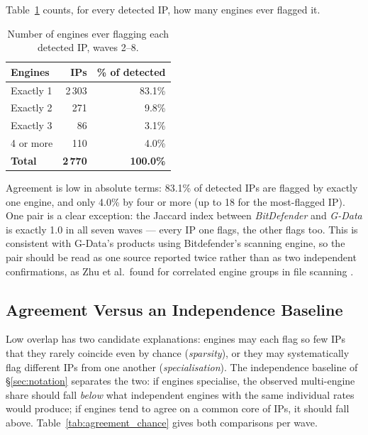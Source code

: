 Table~\ref{tab:agreement} counts, for every detected IP, how many engines ever flagged it.

\begin{table}[h]
  \centering
  \caption{Number of engines ever flagging each detected IP, waves 2--8.}
  \label{tab:agreement}
  \begin{tabular}{lrr}
    \toprule
    \textbf{Engines} & \textbf{IPs} & \textbf{\% of detected} \\
    \midrule
    Exactly 1  & 2\,303 & 83.1\% \\
    Exactly 2  & 271    & 9.8\%  \\
    Exactly 3  & 86     & 3.1\%  \\
    4 or more  & 110    & 4.0\%  \\
    \midrule
    \textbf{Total} & \textbf{2\,770} & \textbf{100.0\%} \\
    \bottomrule
  \end{tabular}
\end{table}

Agreement is low in absolute terms: 83.1\% of detected IPs are flagged by exactly one engine, and
only 4.0\% by four or more (up to 18 for the most-flagged IP). One pair is a clear exception: the
Jaccard index between \emph{BitDefender} and \emph{G-Data} is exactly 1.0 in all seven waves --- every
IP one flags, the other flags too. This is consistent with G-Data's products using Bitdefender's
scanning engine, so the pair should be read as one source reported twice rather than as two
independent confirmations, as Zhu et al.\ found for correlated engine groups in file scanning
\cite{zhu2020labeldynamics}.

\subsection{Agreement Versus an Independence Baseline}
\label{sec:agreement_vs_chance}

Low overlap has two candidate explanations: engines may each flag so few IPs that they rarely
coincide even by chance (\emph{sparsity}), or they may systematically flag different IPs from one
another (\emph{specialisation}). The independence baseline of \S\ref{sec:notation} separates the
two: if engines specialise, the observed multi-engine share should fall \emph{below} what
independent engines with the same individual rates would produce; if engines tend to agree on a
common core of IPs, it should fall above. Table~\ref{tab:agreement_chance} gives both comparisons
per wave.


